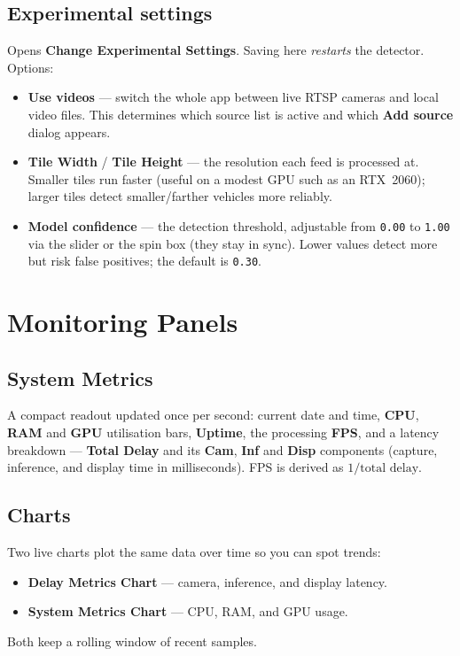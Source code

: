 \documentclass[11pt]{article}
\newcommand{\code}[1]{\texttt{#1}}
\newcommand{\ui}[1]{\textbf{#1}}
\begin{document}
\subsection{Experimental settings}
\label{sec:experimental}
Opens \ui{Change Experimental Settings}. Saving here \emph{restarts} the
detector. Options:
\begin{itemize}[nosep]
  \item \ui{Use videos} --- switch the whole app between live RTSP cameras and
        local video files. This determines which source list is active and which
        \ui{Add source} dialog appears.
  \item \ui{Tile Width} / \ui{Tile Height} --- the resolution each feed is
        processed at. Smaller tiles run faster (useful on a modest GPU such as
        an RTX~2060); larger tiles detect smaller/farther vehicles more
        reliably.
  \item \ui{Model confidence} --- the detection threshold, adjustable from
        \code{0.00} to \code{1.00} via the slider or the spin box (they stay in
        sync). Lower values detect more but risk false positives; the default is
        \code{0.30}.
\end{itemize}

\section{Monitoring Panels}

\subsection{System Metrics}
A compact readout updated once per second: current date and time, \ui{CPU},
\ui{RAM} and \ui{GPU} utilisation bars, \ui{Uptime}, the processing \ui{FPS},
and a latency breakdown --- \ui{Total Delay} and its \ui{Cam}, \ui{Inf} and
\ui{Disp} components (capture, inference, and display time in milliseconds).
FPS is derived as $1/\text{total delay}$.

\subsection{Charts}
Two live charts plot the same data over time so you can spot trends:
\begin{itemize}[nosep]
  \item \ui{Delay Metrics Chart} --- camera, inference, and display latency.
  \item \ui{System Metrics Chart} --- CPU, RAM, and GPU usage.
\end{itemize}
Both keep a rolling window of recent samples.
\end{document}
